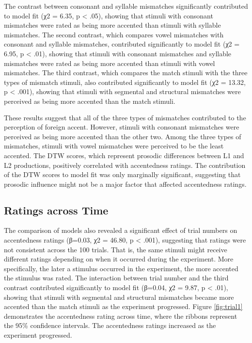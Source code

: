The contrast between consonant and syllable mismatches significantly contributed to model fit (χ2 = 6.35, p < .05), showing that stimuli with consonant mismatches were rated as being more accented than stimuli with syllable mismatches. The second contrast, which compares vowel mismatches with consonant and syllable mismatches, contributed significantly to model fit (χ2 = 6.95, p < .01), showing that stimuli with consonant mismatches and syllable mismatches were rated as being more accented than stimuli with vowel mismatches. The third contrast, which compares the match stimuli with the three types of mismatch stimuli, also contributed significantly to model fit (χ2 = 13.32, p < .001), showing that stimuli with segmental and structural mismatches were perceived as being more accented than the match stimuli. 

These results suggest that all of the three types of mismatches contributed to the perception of foreign accent. However, stimuli with consonant mismatches were perceived as being more accented than the other two. Among the three types of mismatches, stimuli with vowel mismatches were perceived to be the least accented. The DTW scores, which represent prosodic differences between L1 and L2 productions, positively correlated with accentedness ratings. The contribution of the DTW scores to model fit was only marginally significant, suggesting that prosodic influence might not be a major factor that affected accentedness ratings. 

\subsection{Ratings across Time}

The comparison of models also revealed a significant effect of trial numbers on accentedness ratings (β=0.03, χ2 = 46.80, p < .001), suggesting that ratings were not consistent across the 100 trials. That is, the same stimuli might receive different ratings depending on when it occurred during the experiment. More specifically, the later a stimulus occurred in the experiment, the more accented the stimulus was rated. The interaction between trial number and the third contrast contributed significantly to model fit (β=0.04, χ2 = 9.87, p < .01), showing that stimuli with segmental and structural mismatches became more accented than the match stimuli as the experiment progressed. Figure \ref{fig:trial1} demonstrates the accentedness rating across time, where the ribbons represent the 95\% confidence intervals. The accentedness ratings increased as the experiment progressed. 

